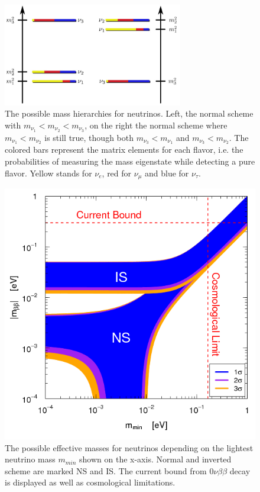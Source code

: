     \begin{figure}
    \centering
    \includegraphics[width=0.7\textwidth]{graphics/standardModel/massHierarchy.jpg}
    	 \caption[Neutrino mass hierarchy]{The possible mass hierarchies for neutrinos. Left, the normal scheme with $m_{\nu_1} < m_{\nu_2} < m_{\nu_3}$, on the right the normal scheme where $m_{\nu_1} < m_{\nu_2}$ is still true, though both $m_{\nu_3} < m_{\nu_1}$ and $m_{\nu_3} < m_{\nu_2}$. The colored bars represent the matrix elements for each flavor, i.e. the probabilities of measuring the mass eigenstate while detecting a pure flavor. Yellow stands for $\nu_e$, red for $\nu_\mu$ and blue for $\nu_\tau$.}
    	\label{fig:massSchemes}
    \end{figure}
    \begin{figure}
    \centering
    \includegraphics[width = 0.7 \textwidth]{graphics/standardModel/massSchemes.png}
	\caption[Effective neutrino mass]{The possible effective masses for neutrinos depending on the lightest neutrino mass $m_{min}$ shown on the x-axis. Normal and inverted scheme are marked NS and IS. The current bound from $0\nu\beta\beta$ decay is displayed as well as cosmological limitations. }
    	\label{fig:massHierarchy}
    \end{figure}

